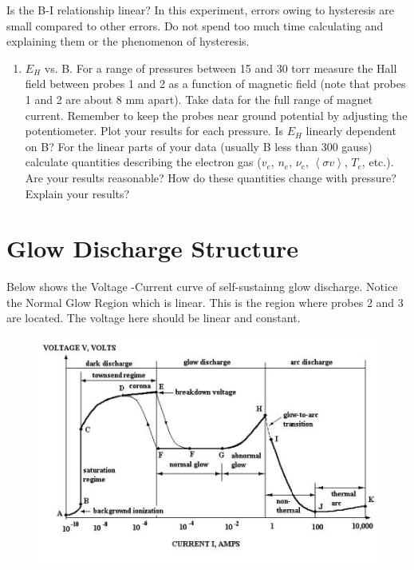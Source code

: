 \documentclass{../lab}
\begin{document}
Is the B-I relationship linear? In this experiment, errors owing to hysteresis are small compared to other errors. Do not spend too much time calculating and explaining them or the phenomenon of hysteresis.

\begin{enumerate}
    \item $E_H$ vs. B. For a range of pressures between 15 and 30 torr measure the Hall field between probes 1 and 2 as a function of magnetic field (note that probes 1 and 2 are about 8 mm apart). Take data for the full range of magnet current. Remember to keep the probes near ground potential by adjusting the potentiometer. Plot your results for each pressure. Is $E_H$ linearly dependent on B? For the linear parts of your data (usually B less than 300 gauss) calculate quantities describing the electron gas ($v_e$, $n_e$, $ \nu_e$, $ \left \langle \sigma v \right \rangle$, $T_e$, etc.). Are your results reasonable? How do these quantities change with pressure? Explain your results?
\end{enumerate}

\section{Glow Discharge Structure}

Below shows the Voltage -Current curve of self-sustainng glow discharge. Notice the Normal Glow Region which is linear. This is the region where probes 2 and 3 are located. The voltage here should be linear and constant.

\begin{figure}[h]
    \centering
    \href{http://experimentationlab.berkeley.edu/sites/default/files/images/DischargeStructure.jpg}{\includegraphics[width=\linewidth]{images/DischargeStructure.jpg}}
    \label{fig:DischargeStructure}
\end{figure}
\end{document}
